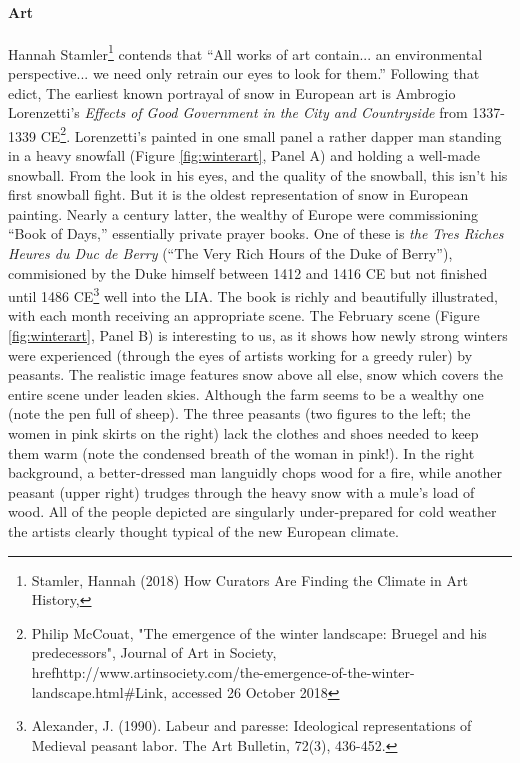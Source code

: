 \paragraph{Art}
Hannah Stamler\footnote{Stamler, Hannah (2018) How Curators Are Finding the Climate in Art History, } contends that ``All works of art contain... an environmental perspective... we need only retrain our eyes to look for them.'' Following that edict, The earliest known portrayal of snow in European art is Ambrogio Lorenzetti's \textit{Effects of Good Government in the City and Countryside} from 1337-1339 CE\footnote{Philip McCouat, "The emergence of the winter landscape: Bruegel and his predecessors", Journal of Art in Society, href{http://www.artinsociety.com/the-emergence-of-the-winter-landscape.html\#}{Link}, accessed 26 October 2018}. Lorenzetti's painted in one small panel a rather dapper man standing in a heavy snowfall (Figure \ref{fig:winterart}, Panel A) and holding a well-made snowball. From the look in his eyes, and the quality of the snowball, this isn't his first snowball fight. But it is the oldest representation of snow in European painting. Nearly a century latter, the wealthy of Europe were commissioning ``Book of Days,'' essentially private prayer books. One of these is \textit{the Tres Riches Heures du Duc de Berry} (``The Very Rich Hours of the Duke of Berry''), commisioned by the Duke himself between 1412 and 1416 CE but not finished until 1486 CE\footnote{Alexander, J. (1990). Labeur and paresse: Ideological representations of Medieval peasant labor. The Art Bulletin, 72(3), 436-452.} well into the LIA. The book is richly and beautifully illustrated, with each month receiving an appropriate scene. The February scene (Figure \ref{fig:winterart}, Panel B) is interesting to us, as it shows how newly strong winters were experienced (through the eyes of artists working for a greedy ruler) by peasants. The realistic image features snow above all else, snow which covers the entire scene under leaden skies. Although the farm seems to be a wealthy one (note the pen full of sheep). The three peasants (two figures to the left; the women in pink skirts on the right) lack the clothes and shoes needed to keep them warm (note the condensed breath of the woman in pink!). In the right background, a better-dressed man languidly chops wood for a fire, while another peasant (upper right) trudges through the heavy snow with a mule's load of wood. All of the people depicted are singularly under-prepared for cold weather the artists clearly thought typical of the new European climate.\\

